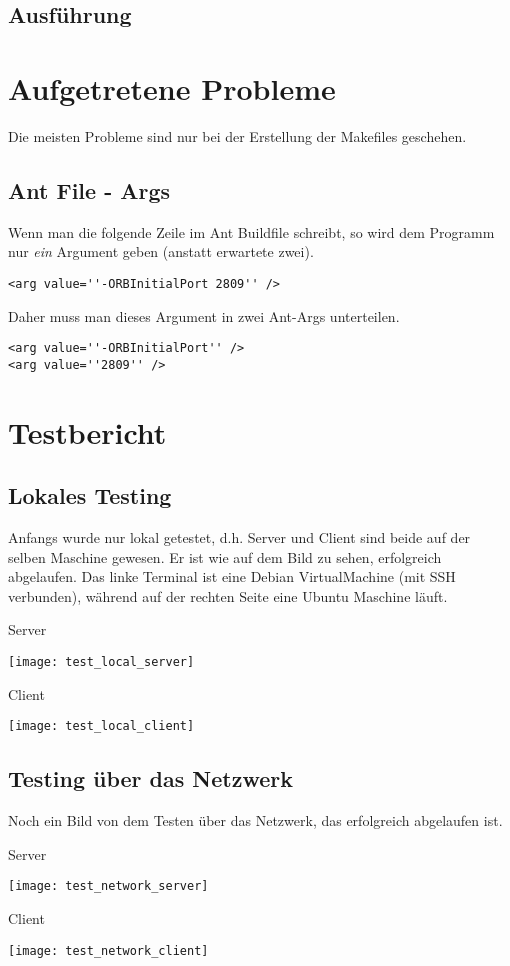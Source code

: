 \documentclass[11pt]{article}
\begin{document}
\subsection{Ausführung}



\section{Aufgetretene Probleme}
Die meisten Probleme sind nur bei der Erstellung der Makefiles geschehen.
\subsection{Ant File - Args}
Wenn man die folgende Zeile im Ant Buildfile schreibt, so wird dem Programm nur \textit{ein} Argument geben (anstatt erwartete zwei).
\begin{lstlisting}
<arg value=''-ORBInitialPort 2809'' />
\end{lstlisting}

Daher muss man dieses Argument in zwei Ant-Args unterteilen.
\begin{lstlisting}
<arg value=''-ORBInitialPort'' />
<arg value=''2809'' />
\end{lstlisting}

\section{Testbericht}

\subsection{Lokales Testing}

Anfangs wurde nur lokal getestet, d.h. Server und Client sind beide auf der selben Maschine gewesen. Er ist wie auf dem Bild zu sehen, erfolgreich abgelaufen. Das linke Terminal ist eine Debian VirtualMachine (mit SSH verbunden), während auf der rechten Seite eine Ubuntu Maschine läuft.

Server
\begin{center}
  \texttt{[image: test\_local\_server]}
\end{center}

Client
\begin{center}
  \texttt{[image: test\_local\_client]}
\end{center}

\subsection{Testing über das Netzwerk}
Noch ein Bild von dem Testen über das Netzwerk, das erfolgreich abgelaufen ist.

Server
\begin{center}
  \texttt{[image: test\_network\_server]}
\end{center}

Client
\begin{center}
  \texttt{[image: test\_network\_client]}
\end{center}

{}


\end{document}
